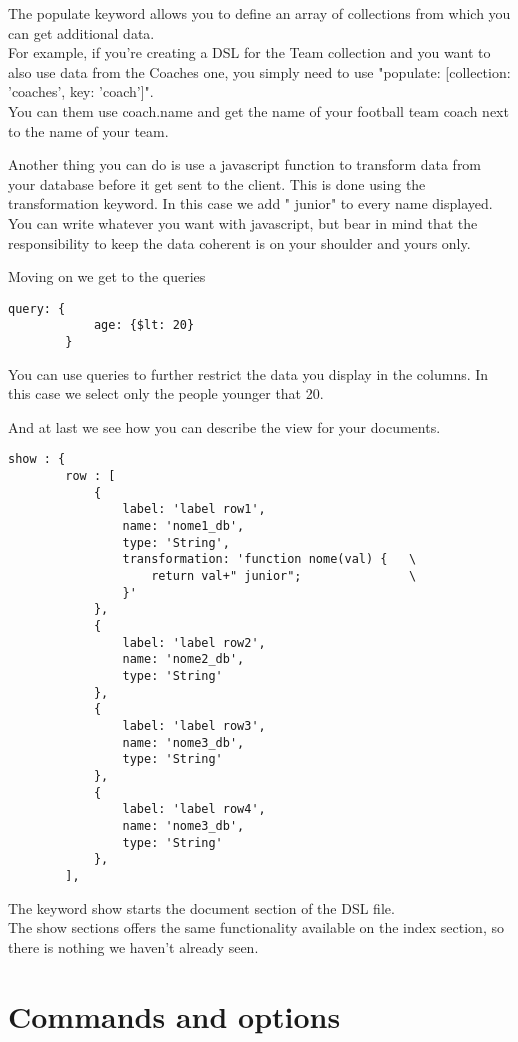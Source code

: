 The populate keyword allows you to define an array of collections from which you can get additional data.\\
For example, if you're creating a DSL for the Team collection and you want to also use data from the Coaches one, you simply need to use "populate: [{collection: 'coaches', key: 'coach'}]".\\
You can them use coach.name and get the name of your football team coach next to the name of your team.


Another thing you can do is use a javascript function to transform data from your database before it get sent to the client.
This is done using the transformation keyword. In this case we add " junior" to every name displayed.\\
You can write whatever you want with javascript, but bear in mind that the responsibility to keep the data coherent is on your shoulder and yours only.


Moving on we get to the queries\\

\begin{lstlisting}
query: {
			age: {$lt: 20}
		}
\end{lstlisting}
You can use queries to further restrict the data you display in the columns. In this case we select only the people younger that 20.


And at last we see how you can describe the view for your documents.\\

\begin{lstlisting}
show : {
		row : [
			{
				label: 'label row1',
				name: 'nome1_db',
				type: 'String',
				transformation: 'function nome(val) {	\
					return val+" junior";				\
				}'
			},
			{	
				label: 'label row2',
				name: 'nome2_db',
				type: 'String'
			},
			{	
				label: 'label row3',
				name: 'nome3_db',
				type: 'String'
			},
			{	
				label: 'label row4',
				name: 'nome3_db',
				type: 'String'
			},
		],

\end{lstlisting}



The keyword show starts the document section of the DSL file.\\
The show sections offers the same functionality available on the index section, so there is nothing we haven't already seen.


\section{Commands and options}

